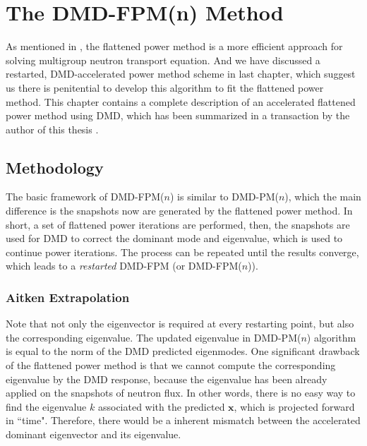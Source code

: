 \cleardoublepage

\chapter{The DMD-FPM(n) Method}
\label{chapter:DMD-FPM(n)}

As mentioned in , the flattened power method is a more efficient approach for solving multigroup neutron transport equation.
And we have discussed a restarted, DMD-accelerated power method scheme in last chapter, which suggest us there is penitential to develop this algorithm to fit the flattened power method.
This chapter contains a complete description of an accelerated flattened power method using DMD, which has been summarized in a transaction by the author of this thesis \cite{xu_acceleration}. 

\section{Methodology}
The basic framework of DMD-FPM($n$) is similar to DMD-PM($n$), which the main difference is the snapshots now are generated by the flattened power method.
In short, a set of flattened power iterations are performed, then, the snapshots are used for DMD to correct the dominant mode and eigenvalue, which is used to continue power iterations.
The process can be repeated until the results converge, which leads to a {\it restarted} DMD-FPM (or DMD-FPM($n$)).

\subsection{Aitken Extrapolation}
Note that not only the eigenvector is required at every restarting point, but also the corresponding eigenvalue.
The updated eigenvalue in DMD-PM($n$) algorithm is equal to the norm of the DMD predicted eigenmodes. 
One significant drawback of the flattened power method is that we cannot compute the corresponding eigenvalue by the DMD response, because the eigenvalue has been already applied on the snapshots of neutron flux.
In other words, there is no easy way to find the eigenvalue $k$ associated with the predicted $\mathbf{x}$, which is projected forward in ``time".
Therefore, there would be a inherent mismatch between the accelerated dominant eigenvector and its eigenvalue.

